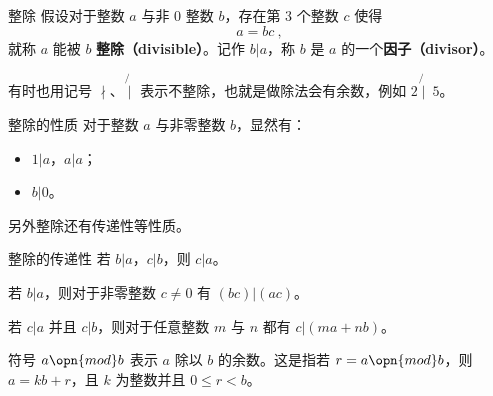 
\begin{definition}{整除}
假设对于整数 $a$ 与非 $0$ 整数 $b$，存在第 $3$ 个整数 $c$ 使得
\begin{equation}
a = bc ~,
\end{equation}
就称 $a$ 能被 $b$ \textbf{整除（divisible）}。记作 $b | a$，称 $b$ 是 $a$ 的一个\textbf{因子（divisor）}。
\end{definition}

有时也用记号 $\nmid$、$\not{\mid}$ 表示不整除，也就是做除法会有余数，例如 $2 \not{\mid}~ 5$。

\begin{corollary}{整除的性质}
对于整数 $a$ 与非零整数 $b$，显然有：
\begin{itemize}
\item $1 | a$，$a | a$；
\item $b | 0$。
\end{itemize}
\end{corollary}

另外整除还有传递性等性质。
\begin{theorem}{整除的传递性}
若 $b|a$，$c|b$，则 $c|a$。
\end{theorem}
\begin{theorem}{}
若 $b|a$，则对于非零整数 $c \neq 0$ 有 $(bc) | (ac)$。
\end{theorem}
\begin{theorem}{}
若 $c|a$ 并且 $c|b$，则对于任意整数 $m$ 与 $n$ 都有 $c | (ma + nb)$。
\end{theorem}

\begin{definition}{}
符号 $a \opn{mod} b$ 表示 $a$ 除以 $b$ 的余数。这是指若 $r = a \opn{mod} b$，则 $a = kb + r$，且 $k$ 为整数并且 $0 \le r < b$。
\end{definition}